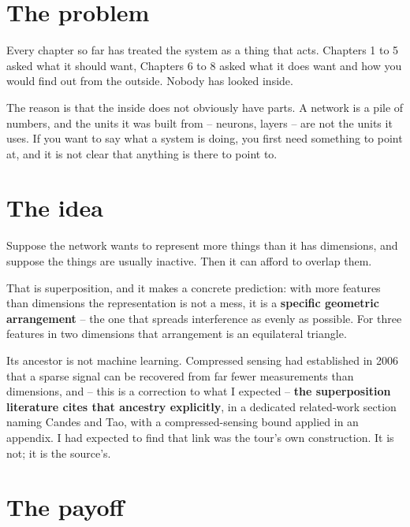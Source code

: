 \section*{The problem}

Every chapter so far has treated the system as a thing that acts. Chapters 1 to 5 asked what it should want, Chapters 6 to 8 asked what it does want and how you would find out from the outside. Nobody has looked inside.

The reason is that the inside does not obviously have parts. A network is a pile of numbers, and the units it was built from -- neurons, layers -- are not the units it uses. If you want to say what a system is doing, you first need something to point at, and it is not clear that anything is there to point to.

\section*{The idea}

Suppose the network wants to represent more things than it has dimensions, and suppose the things are usually inactive. Then it can afford to overlap them.

That is superposition, and it makes a concrete prediction: with more features than dimensions the representation is not a mess, it is a \textbf{specific geometric arrangement} -- the one that spreads interference as evenly as possible. For three features in two dimensions that arrangement is an equilateral triangle.

Its ancestor is not machine learning. Compressed sensing had established in 2006 that a sparse signal can be recovered from far fewer measurements than dimensions, and -- this is a correction to what I expected -- \textbf{the superposition literature cites that ancestry explicitly}, in a dedicated related-work section naming Candes and Tao, with a compressed-sensing bound applied in an appendix. I had expected to find that link was the tour's own construction. It is not; it is the source's.

\section*{The payoff}

